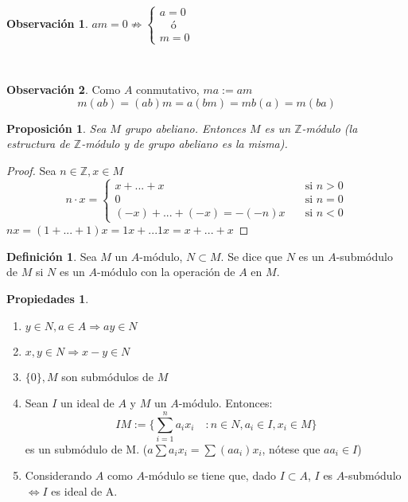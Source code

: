 \documentclass{article}
\theoremstyle{theorem-style}  %
\newtheorem{proposition}[theorem]{Proposición}
\theoremstyle{definition}
\newtheorem{definition}{Definición}[section]
\newtheorem*{observation}{Observación} %
\newtheorem*{properties}{Propiedades}
\theoremstyle{example-style}
\begin{document}
	\begin{observation}
		$am=0 \nRightarrow \begin{cases}
		a=0\\
		\quad\text{ó}\\
		m=0
		\end{cases}$
	\end{observation}
	\ 

	\begin{observation}
		Como $A$ conmutativo, $ma:=am$
		\[m(ab)=(ab)m=a(bm)=mb(a)=m(ba)\]
	\end{observation}
	\begin{proposition}
		Sea $M$ grupo abeliano.
		Entonces $M$ es un $\mathbb{Z}$-módulo (la estructura de $\mathbb{Z}$-módulo y de grupo abeliano es la misma).
	\end{proposition}
	\begin{proof}
		Sea $n \in \mathbb{Z}, x\in M$
		\[n\cdot x= \begin{cases}
			x+...+x&\quad \text{si }n>0\\
			0 &\quad \text{si } n=0\\
			(-x)+...+(-x)=-(-n)x &\quad \text{si }n<0
		\end{cases}
		 \]
		$nx=(1+...+1)x=1x+...1x=x+...+x$
	\end{proof}


	\begin{definition}
		Sea $M$ un $A$-módulo, $N\subset M$.
		Se dice que $N$ es un $A$-submódulo de $M$ si $N$ es un $A$-módulo con la operación de $A$ en $M$.
	\end{definition}

	\begin{properties}
		\ 
		\begin{enumerate}
			\item $ y \in N, a \in A \Rightarrow  ay\in N$
			\item $ x,y\in N  \Rightarrow x-y \in N$
			\item $\{0\}, M$ son submódulos de $M$
			\item Sean $I$ un ideal de $A$ y $M$ un $A$-módulo. Entonces:
			\[IM:=\{ \sum_{i=1}^{n} a_ix_i \quad : n \in N, a_i \in I, x_i \in M\}\]
			es un submódulo de M. ($a  \sum a_i x_i = \sum (a a_i)  x_i$, nótese que $aa_i\in I$)

			\item Considerando $A$ como $A$-módulo se tiene que, dado $I\subset A$, $I$ es $A$-submódulo $\Leftrightarrow I$ es ideal de A.
		\end{enumerate}
	\end{properties}
	\
\end{document}
